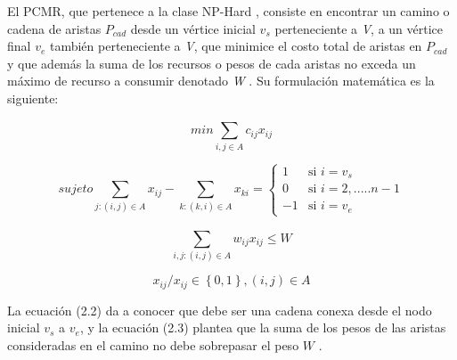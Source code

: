 El PCMR, que pertenece a la clase NP-Hard \citep{joksch1966shortest}, consiste en encontrar un camino o cadena de aristas $P_{cad}$ desde un vértice inicial $v_s$ perteneciente a \emph{V}, a un vértice final $v_e$ también perteneciente a \emph{V}, que minimice el costo total de aristas en $P_{cad}$ y que además la suma de los recursos o pesos de cada aristas no exceda un máximo de recurso a consumir denotado \emph{W} \citep{dumitrescu2001algorithms}. Su formulación matemática es la siguiente:


\begin{equation}
min \sum_{i,j \in A}^{}{c_{ij}x_{ij}}
\end{equation}

\begin{equation}
sujeto  \sum_{j:(i,j) \in A }^{}{x_{ij}} - \sum_{k:(k,i) \in A}^{}{x_{ki}} = \begin{cases}
      1              & \mbox{si } i= v_s   \\
      0 			 & \mbox{si } i= 2,..... n-1 \\
      -1 			 & \mbox{si } i= v_e
   \end{cases}
\end{equation}

\begin{equation}
\sum_{i,j: (i,j) \in A}^{}{w_{ij}x_{ij}} \leq W
\end{equation}

\begin{equation}
x_{ij} /x_{ij} \in  \left \{0,1 \right \} , (i,j)  \in A
\end{equation}

La ecuación (2.2) da a conocer que debe ser una cadena conexa desde el nodo inicial $v_s$ a $v_e$, y la ecuación (2.3) plantea que la suma de los pesos de las aristas consideradas en el camino no debe sobrepasar el peso $W$ \citep{santos2007improved}.


